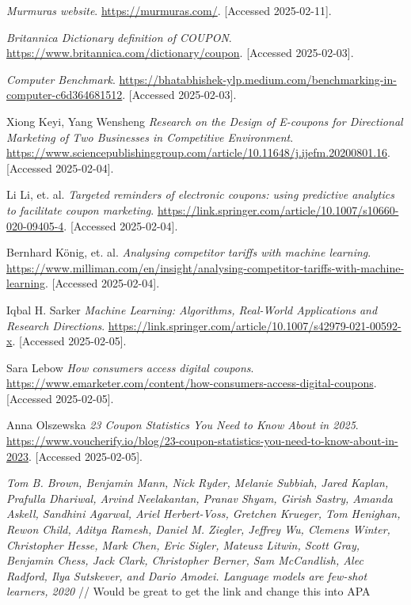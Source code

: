\documentclass[licencjacka,en]{pracamgr}
\begin{document}
\begin{thebibliography}{99}


\textit{Murmuras website}.  
\url{https://murmuras.com/}.  
[Accessed 2025-02-11].

\textit{Britannica Dictionary definition of COUPON}.  
\url{https://www.britannica.com/dictionary/coupon}.  
[Accessed 2025-02-03].

\textit{Computer Benchmark}.  
\url{https://bhatabhishek-ylp.medium.com/benchmarking-in-computer-c6d364681512}.  
[Accessed 2025-02-03].

Xiong Keyi, Yang Wensheng
\textit{Research on the Design of E-coupons for Directional Marketing of Two Businesses in Competitive Environment}.  
\url{https://www.sciencepublishinggroup.com/article/10.11648/j.ijefm.20200801.16}.  
[Accessed 2025-02-04].

Li Li, et. al.
\textit{Targeted reminders of electronic coupons: using predictive analytics to facilitate coupon marketing}.  
\url{https://link.springer.com/article/10.1007/s10660-020-09405-4}.  
[Accessed 2025-02-04].

Bernhard König, et. al.
\textit{Analysing competitor tariffs with machine learning}.  
\url{https://www.milliman.com/en/insight/analysing-competitor-tariffs-with-machine-learning}.  
[Accessed 2025-02-04].

Iqbal H. Sarker
\textit{Machine Learning: Algorithms, Real-World Applications and Research Directions}.  
\url{https://link.springer.com/article/10.1007/s42979-021-00592-x}.  
[Accessed 2025-02-05].

Sara Lebow 
\textit{How consumers access digital coupons}.  
\url{https://www.emarketer.com/content/how-consumers-access-digital-coupons}.  
[Accessed 2025-02-05].

Anna Olszewska
\textit{23 Coupon Statistics You Need to Know About in 2025}.  
\url{https://www.voucherify.io/blog/23-coupon-statistics-you-need-to-know-about-in-2023}.  
[Accessed 2025-02-05].

\textit{Tom B. Brown, Benjamin Mann, Nick Ryder, Melanie Subbiah, Jared
Kaplan, Prafulla Dhariwal, Arvind Neelakantan, Pranav Shyam, Girish
Sastry, Amanda Askell, Sandhini Agarwal, Ariel Herbert-Voss, Gretchen
Krueger, Tom Henighan, Rewon Child, Aditya Ramesh, Daniel M.
Ziegler, Jeffrey Wu, Clemens Winter, Christopher Hesse, Mark Chen,
Eric Sigler, Mateusz Litwin, Scott Gray, Benjamin Chess, Jack Clark,
Christopher Berner, Sam McCandlish, Alec Radford, Ilya Sutskever, and
Dario Amodei. Language models are few-shot learners, 2020}
// Would be great to get the link and change this into APA


\end{thebibliography}
\end{document}
